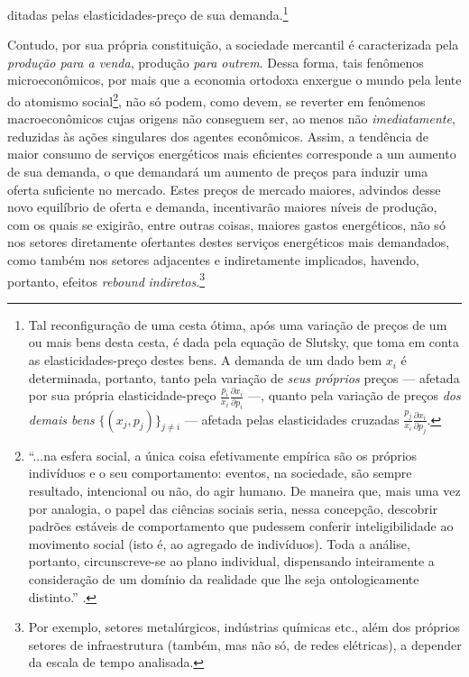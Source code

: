 ditadas pelas elasticidades-preço de sua demanda.\footnote{Tal reconfiguração de uma cesta ótima, após uma variação de preços de um ou mais bens desta cesta, é dada pela equação de Slutsky, que toma em conta as elasticidades-preço destes bens. A demanda de um dado bem $x_i$ é determinada, portanto, tanto pela variação de \textit{seus próprios} preços --- afetada por sua própria elasticidade-preço $\frac{p_i}{x_i} \frac{\partial x_i}{\partial p_i}$ ---, quanto pela variação de preços \textit{dos demais bens} $\{(x_j, p_j)\}_{j \neq i}$ --- afetada pelas elasticidades cruzadas $\frac{p_j}{x_i} \frac{\partial x_i}{\partial p_j}$.}

Contudo, por sua própria constituição, a sociedade mercantil é caracterizada pela \textit{produção para a venda}, produção \textit{para outrem}. Dessa forma, tais fenômenos microeconômicos, por mais que a economia ortodoxa enxergue o mundo pela lente do atomismo social\footnote{``...na esfera social, a única coisa efetivamente empírica são os próprios indivíduos e o seu comportamento: eventos, na sociedade, são sempre resultado, intencional ou não, do agir humano. De maneira que, mais uma vez por analogia, o papel das ciências sociais seria, nessa concepção, descobrir padrões estáveis de comportamento que pudessem conferir inteligibilidade ao movimento social (isto é, ao agregado de indivíduos). Toda a análise, portanto, circunscreve-se ao plano individual, dispensando inteiramente a consideração de um domínio da realidade que lhe seja ontologicamente distinto.'' \parencite[p. 58]{Medeiros2013}.}, não só podem, como devem, se reverter em fenômenos macroeconômicos cujas origens não conseguem ser, ao menos não \textit{imediatamente}, reduzidas às ações singulares dos agentes econômicos. Assim, a tendência de maior consumo de serviços energéticos mais eficientes%
 corresponde a um aumento de sua demanda, o que demandará um aumento de preços para induzir uma oferta suficiente no mercado. Estes preços de mercado maiores, advindos desse novo equilíbrio de oferta e demanda, incentivarão maiores níveis de produção, com os quais se exigirão, entre outras coisas, maiores gastos energéticos, não só nos setores diretamente ofertantes destes serviços energéticos mais demandados, como também nos setores adjacentes e indiretamente implicados, havendo, portanto, efeitos \textit{rebound} \textit{indiretos}.\footnote{Por exemplo, setores metalúrgicos, indústrias químicas etc., além dos próprios setores de infraestrutura (também, mas não só, de redes elétricas), a depender da escala de tempo analisada.}


